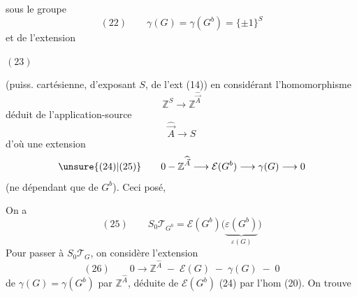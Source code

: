 sous le groupe
\[
(22)\qquad\gamma(G)=\gamma(G^b)=\{\pm1\}^S
\]
et de l'extension

$(23)$\quad
{}

(puiss. cartésienne, d'exposant $S$, de l'ext (14))
en considérant l'homomorphisme
\[
\mathbb Z^S\longrightarrow\mathbb Z^{\widehat{\vec A}}
\]
déduit de l'application-source
\[
\widehat{\vec A}\longrightarrow S
\]
d'où une extension
\[
\unsure{(24)|(25)}\qquad0-\mathbb Z^{\widehat{\vec A}}\longrightarrow\mathcal E(G^b)\longrightarrow\gamma(G)\longrightarrow0
\]
(ne dépendant que de $G^b$). Ceci posé,

On a
\[
(25)\qquad S_0\mathcal T_{G^b}=\mathcal E(G^b)\bigl(\underbrace{\varepsilon(G^b)}_{\varepsilon(G)}\bigr)
\]
Pour passer à $S_0\mathcal T_G$, on considère l'extension
\[
(26)\qquad0\longrightarrow\mathbb Z^{\widehat A}\;-\;\mathcal E(G)\;-\;\gamma(G)\;-\;0
\]
de $\gamma(G)=\gamma(G^b)$ par $\mathbb Z^{\widehat A}$, déduite de $\mathcal E(G^b)$ (24) par l'hom (20). On trouve
